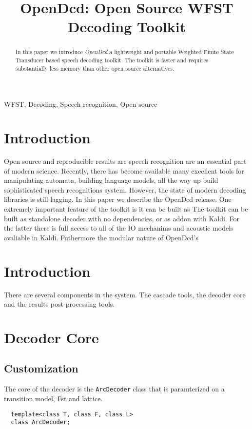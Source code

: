 \documentclass{article}
\title{OpenDcd: Open Source WFST Decoding Toolkit}
\begin{document}
%
\maketitle
%
\begin{abstract}
In this paper we introduce \emph{OpenDcd} a lightweight and portable Weighted Finite State
Transducer based speech decoding toolkit. The toolkit is faster and requires
substantially less memory than other open source alternatives.
\end{abstract}
%
\begin{keywords}
WFST, Decoding, Speech recognition, Open source
\end{keywords}
%
\section{Introduction}
\label{sec:intro}


Open source and reproducible results are speech recognition are an essential
part of modern science. Recently, there has become available many excellent
tools for manipulating automata, building language models, all the way up
build sophisticated speech recognitions system.  However, the state of modern 
decoding libraries is still lagging. In this paper we describe the OpenDcd release. 
One extremely important feature of the toolkit is it can be built as 
The toolkit can be built as standalone decoder with no dependencies, or as addon
with Kaldi. For the latter there is full access to all of the IO mechanims and 
acoustic models avaliable in Kaldi. Futhermore the modular nature of OpenDcd's 

\section{Introduction}
\label{sec:format}
There are several components in the system. The cascade tools, the decoder core
and the results post-processing tools.

\section{Decoder Core}
\label{sec:decodercore}

\subsection{Customization}
\label{sec:custom}

The core of the decoder is the \texttt{ArcDecoder} class that is paramterized on a transition
model, Fst  and lattice.
\begin{verbatim}
  template<class T, class F, class L>
  class ArcDecoder;
\end{verbatim}
\end{document}
